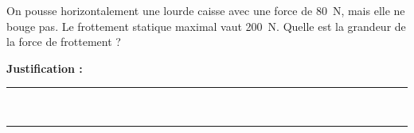 On pousse horizontalement une lourde caisse avec une force de \qty{80}{N}, mais elle ne bouge pas. Le frottement statique maximal vaut \qty{200}{N}. Quelle est la grandeur de la force de frottement ?

\choices

\noindent\textbf{Justification :} \hrulefill \\[2.5ex]
\rule{\linewidth}{0.4pt} \\[2.5ex]
\rule{\linewidth}{0.4pt}
\vfill
